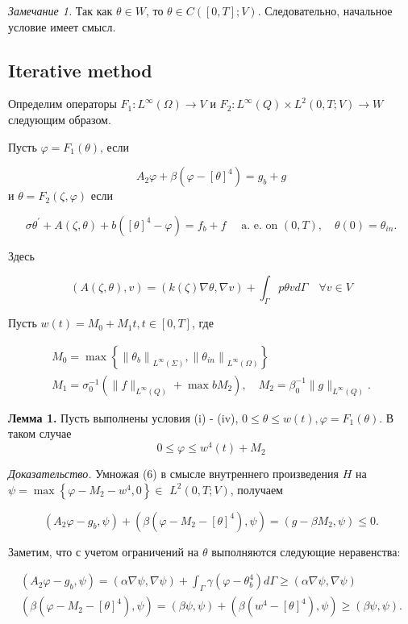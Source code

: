 \textit{Замечание 1.}
Так как $\theta \in W$, то $\theta \in C([0, T] ; V)$.
Следовательно, начальное условие имеет смысл.

\subsection{Iterative method}\label{subsec:ch3:sec1:subsec3}
Определим операторы
$F_{1}: L^{\infty}(\Omega) \rightarrow V$ и $F_{2}: L^{\infty}(Q) \times L^{2}(0, T ;V) \rightarrow W$
следующим образом.


Пусть $\varphi=F_{1}(\theta)$, если

\[
    A_{2} \varphi+\beta\left(\varphi-[\theta]^{4}\right)=g_{b}+g
\]
и $\theta=F_{2}(\zeta, \varphi)$ если

\[
    \sigma \theta^{\prime}+A(\zeta, \theta)+b\left([\theta]^{4}-\varphi\right)=f_{b}
    +f \quad \text { a. e. on }(0, T), \quad \theta(0)=\theta_{i n}.
\]


Здесь

\[
    (A(\zeta, \theta), v)=(k(\zeta) \nabla \theta, \nabla v)
    +\int_{\Gamma} p \theta v d \Gamma \quad \forall v \in V
\]


Пусть $w(t)=M_{0}+M_{1} t, t \in[0, T]$, где

\[
    \begin{gathered}
        M_{0}=\max \left\{\left\|\theta_{b}\right\|_{L^{\infty}(\Sigma)},
        \left\|\theta_{i n}\right\|_{L^{\infty}(\Omega)}\right\} \\
        M_{1}=\sigma_{0}^{-1}\left(\|f\|_{L^{\infty}(Q)}+\max b M_{2}\right),
        \quad M_{2}=\beta_{0}^{-1}\|g\|_{L^{\infty}(Q)} .
    \end{gathered}
\]



\textbf{Лемма 1.}
Пусть выполнены условия (i) - (iv), $0 \leq \theta \leq w(t), \varphi=F_{1}(\theta)$.
В таком случае
\[
    0 \leq \varphi \leq w^{4}(t)+M_{2}
\]


\textit{Доказательство.}
Умножая (6) в смысле внутреннего произведения $H$ на
$\psi=\max \left\{\varphi-M_{2}-w^{4}, 0\right\} \in$ $L^{2}(0, T ; V)$, получаем

\[
    \left(A_{2} \varphi-g_{b}, \psi\right)+\left(\beta\left(\varphi-M_{2}-[\theta]^{4}\right),
    \psi\right)=\left(g-\beta M_{2}, \psi\right) \leq 0.
\]


Заметим, что с учетом ограничений на $\theta$ выполняются следующие неравенства:

\[
    \begin{gathered}
        \left(A_{2} \varphi-g_{b}, \psi\right)=(\alpha \nabla \psi, \nabla \psi)+\int_{\Gamma} \gamma\left(\varphi-\theta_{b}^{4}\right) d \Gamma \geq(\alpha \nabla \psi, \nabla \psi) \\
        \left(\beta\left(\varphi-M_{2}-[\theta]^{4}\right), \psi\right)=(\beta \psi, \psi)+\left(\beta\left(w^{4}-[\theta]^{4}\right), \psi\right) \geq(\beta \psi, \psi) .
    \end{gathered}
\]



